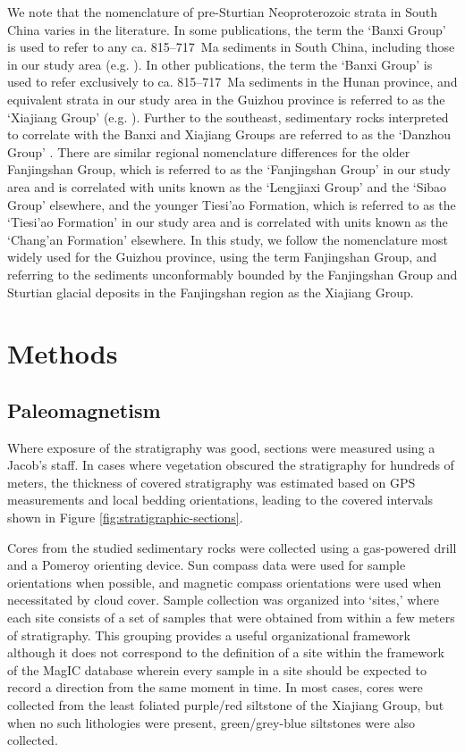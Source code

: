 We note that the nomenclature of pre-Sturtian Neoproterozoic strata in South China varies in the literature. In some publications, the term the `Banxi Group' is used to refer to any ca. 815--717~Ma sediments in South China, including those in our study area (e.g. \citealp{Zhao2011a, Zhang2019c}). In other publications, the term the `Banxi Group' is used to refer exclusively to ca. 815--717~Ma sediments in the Hunan province, and equivalent strata in our study area in the Guizhou province is referred to as the `Xiajiang Group' (e.g. \citealp{BGMRGZ1984a, Wang2014a, Xiong2014a, Geng2015a, Li2016b, Wang2016c, Yan2019a}). Further to the southeast, sedimentary rocks interpreted to correlate with the Banxi and Xiajiang Groups are referred to as the `Danzhou Group' \citep{Yan2019a}. There are similar regional nomenclature differences for the older Fanjingshan Group, which is referred to as the `Fanjingshan Group' in our study area and is correlated with units known as the `Lengjiaxi Group' and the `Sibao Group' elsewhere, and the younger Tiesi'ao Formation, which is referred to as the `Tiesi'ao Formation' in our study area and is correlated with units known as the `Chang'an Formation' elsewhere. In this study, we follow the nomenclature most widely used for the Guizhou province, using the term Fanjingshan Group, and referring to the sediments unconformably bounded by the Fanjingshan Group and Sturtian glacial deposits in the Fanjingshan region as the Xiajiang Group.

\section{Methods}

\subsection{Paleomagnetism}

Where exposure of the stratigraphy was good, sections were measured using a Jacob’s staff. In cases where vegetation obscured the stratigraphy for hundreds of meters, the thickness of covered stratigraphy was estimated based on GPS measurements and local bedding orientations, leading to the covered intervals shown in Figure \ref{fig:stratigraphic-sections}.

Cores from the studied sedimentary rocks were collected using a gas-powered drill and a Pomeroy orienting device. Sun compass data were used for sample orientations when possible, and magnetic compass orientations were used when necessitated by cloud cover. Sample collection was organized into `sites,' where each site consists of a set of samples that were obtained from within a few meters of stratigraphy. This grouping provides a useful organizational framework although it does not correspond to the definition of a site within the framework of the MagIC database wherein every sample in a site should be expected to record a direction from the same moment in time. In most cases, cores were collected from the least foliated purple/red siltstone of the Xiajiang Group, but when no such lithologies were present, green/grey-blue siltstones were also collected.

